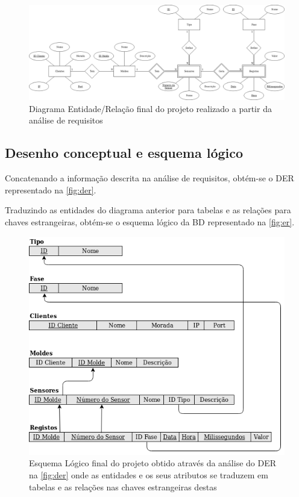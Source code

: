 \documentclass[11pt,twoside,a4paper]{report}
\begin{document}
\begin{landscape}
	\begin{figure}
		\begin{center}
			\includegraphics[width=1.4\textwidth]{diagrama_entidade_relacao} %
			\caption[Diagrama Entidade/Relação final do projeto]{Diagrama Entidade/Relação final do projeto realizado a partir da análise de requisitos}
			\label{fig:der}
		\end{center}
	\end{figure}
\end{landscape}
\subsection{Desenho conceptual e esquema lógico}
Concatenando a informação descrita na análise de requisitos, obtém-se o DER representado na \autoref{fig:der}.\par
Traduzindo as entidades do diagrama anterior para tabelas e as relações para chaves estrangeiras, obtém-se o esquema lógico da BD representado na \autoref{fig:er}.
\begin{figure}[H]
	\begin{center}
		\includegraphics[width=1\textwidth]{esquema_relacional} %
		\caption[Esquema Lógico final do projeto]{Esquema Lógico final do projeto obtido através da análise do DER na \autoref{fig:der} onde as entidades e os seus atributos se traduzem em tabelas e as relações nas chaves estrangeiras destas}
		\label{fig:er}
	\end{center}
\end{figure}
\end{document}
